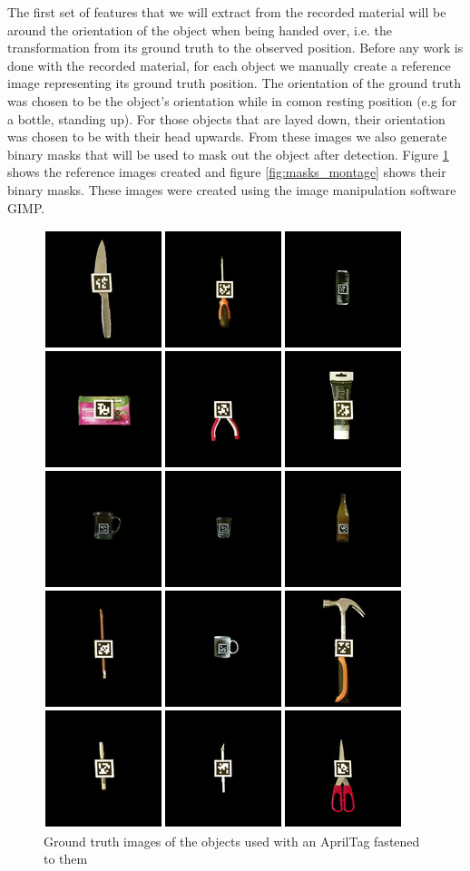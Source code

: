 The first set of features that we will extract from the recorded material will be around the orientation of the object when being handed over, i.e. the transformation from its ground truth to the observed position. Before any work is done with the recorded material, for each object we manually create a reference image representing its ground truth position. The orientation of the ground truth was chosen to be the object's orientation while in comon resting position (e.g for a bottle, standing up). For those objects that are layed down, their orientation was chosen to be with their head upwards. From these images we also generate binary masks that will be used to mask out the object after detection. Figure \ref{fig:objects_montage} shows the reference images created and figure \ref{fig:masks_montage} shows their binary masks. These images were created using the image manipulation software GIMP.

\begin{figure}
	\centering
	\includegraphics[width=\textwidth]{img/methods/objects.jpg}
	\caption{Ground truth images of the objects used with an AprilTag fastened to them}
	\label{fig:objects_montage}
\end{figure}

